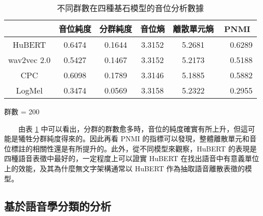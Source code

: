\begin{table}[!htbp]
            \vspace{0.5cm}        

            \begin{subtable}[t]{\textwidth}
                \centering
                \begin{tabular}{|c|c|c|c|c|c|} \hline 
                                & 音位純度 & 分群純度 & 音位熵 & 離散單元熵 &    PNMI \\ \hline 
                    HuBERT      &   0.6474 &   0.1644 & 3.3152 &     5.2681 &　0.6289 \\ \hline    %
                    wav2vec 2.0 &   0.5427 &   0.1467 & 3.3152 &     5.2173 &　0.5188 \\ \hline    %
                    CPC         &   0.6098 &   0.1789 & 3.3146 &     5.1885 &　0.5882 \\ \hline    %
                    LogMel      &   0.3474 &   0.0569 & 3.3158 &     5.2322 &　0.2955 \\ \hline    %
                \end{tabular}
                \caption{群數 = 200}
                \label{tab:ch3-clu200}
            \end{subtable}        

            \caption{不同群數在四種基石模型的音位分析數據}
            \label{tab:single-cluster-results}
        \end{table}

　　由表 \ref{tab:single-cluster-results} 中可以看出，分群的群數愈多時，音位的純度確實有所上升，但這可能是犧牲分群純度得來的。因此再看 PNMI 的指標可以發現，整體離散單元和音位標註的相關性還是有所提升的。此外，從不同模型來觀察，HuBERT 的表現是四種語音表徵中最好的，一定程度上可以證實 HuBERT 在找出語音中有意義單位上的效能，及其為什麼無文字架構通常以 HuBERT 作為抽取語音離散表徵的模型。

\subsection{基於語音學分類的分析}

